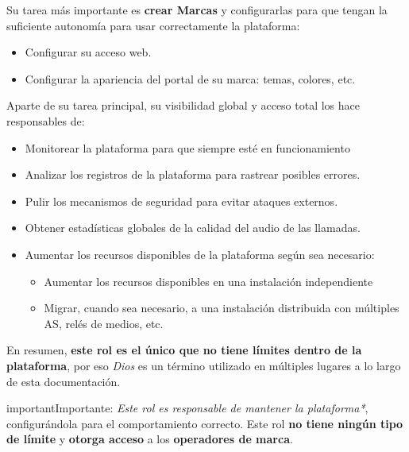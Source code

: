 \documentclass[letterpaper,10pt,spanish]{sphinxmanual}
\begin{document}
Su tarea más importante es \textbf{crear Marcas} y configurarlas para que tengan la suficiente autonomía para usar correctamente la plataforma:
\begin{itemize}
\item {} 
Configurar su acceso web.

\item {} 
Configurar la apariencia del portal de su marca: temas, colores, etc.

\end{itemize}

Aparte de su tarea principal, su visibilidad global y acceso total los hace responsables de:
\begin{itemize}
\item {} 
Monitorear la plataforma para que siempre esté en funcionamiento

\item {} 
Analizar los registros de la plataforma para rastrear posibles errores.

\item {} 
Pulir los mecanismos de seguridad para evitar ataques externos.

\item {} 
Obtener estadísticas globales de la calidad del audio de las llamadas.

\item {} 
Aumentar los recursos disponibles de la plataforma según sea necesario:
\begin{itemize}
\item {} 
Aumentar los recursos disponibles en una instalación independiente

\item {} 
Migrar, cuando sea necesario, a una instalación distribuida con múltiples AS, relés de medios, etc.

\end{itemize}

\end{itemize}

En resumen, \textbf{este rol es el único que no tiene límites dentro de la plataforma}, por eso \emph{Dios} es un término utilizado en múltiples lugares a lo largo de esta documentación.

\begin{notice}{important}{Importante:}
\emph{Este rol es responsable de mantener la plataforma*}, configurándola para el comportamiento correcto. Este rol \textbf{no tiene ningún tipo de límite} y \textbf{otorga acceso} a los \textbf{operadores de marca}.
\end{notice}
\end{document}
